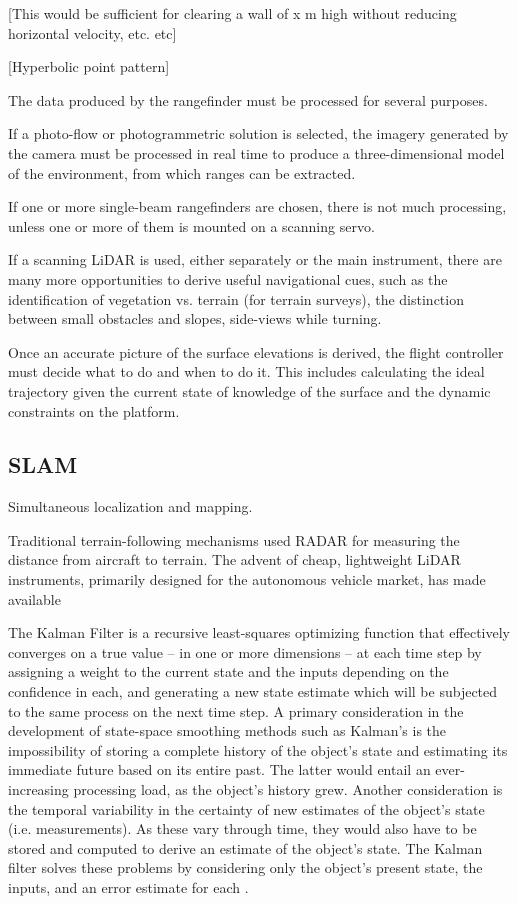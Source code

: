 \documentclass[10pt,a4paper]{report}
\begin{document}
[This would be sufficient for clearing a wall of x m high without reducing horizontal velocity, etc. etc]

[Hyperbolic point pattern]

The data produced by the rangefinder must be processed for several purposes. 

If a photo-flow or photogrammetric solution is selected, the imagery generated by the camera must be processed in real time to produce a three-dimensional model of the environment, from which ranges can be extracted.

If one or more single-beam rangefinders are chosen, there is not much processing, unless one or more of them is mounted on a scanning servo.

If a scanning LiDAR is used, either separately or the main instrument, there are many more opportunities to derive useful navigational cues, such as the identification of vegetation vs. terrain (for terrain surveys), the distinction between small obstacles and slopes, side-views while turning.

Once an accurate picture of the surface elevations is derived, the flight controller must decide what to do and when to do it. This includes calculating the ideal trajectory given the current state of knowledge of the surface and the dynamic constraints on the platform.


\iffalse


\subsection{SLAM}

Simultaneous localization and mapping.

Traditional terrain-following mechanisms used RADAR for measuring the distance from aircraft to terrain. The advent of cheap, lightweight LiDAR instruments, primarily designed for the autonomous vehicle market, has made available 


The Kalman Filter \cite{Kalman1960} is a recursive least-squares optimizing function that effectively converges on a true value -- in one or more dimensions -- at each time step by assigning a weight to the current state and the inputs depending on the confidence in each, and generating a new state estimate which will be subjected to the same process on the next time step. A primary consideration in the development of state-space smoothing methods such as Kalman's is the impossibility of storing a complete history of the object's state and estimating its immediate future based on its entire past. The latter would entail an ever-increasing processing load, as the object's history grew. Another consideration is the temporal variability in the certainty of new estimates of the object's state (i.e. measurements). As these vary through time, they would also have to be stored and computed to derive an estimate of the object's state. The Kalman filter solves these problems by considering only the object's present state, the inputs, and an error estimate for each \cite{Swerling1959}. 
\end{document}
